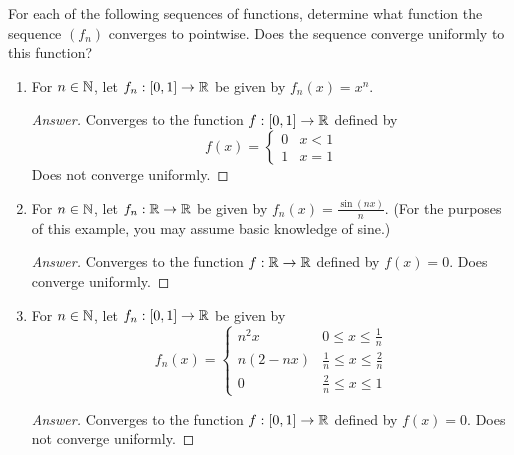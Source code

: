 \documentclass[../main.tex]{subfiles}
\begin{document}
\begin{exercise}\label{exr:17.5}
    For each of the following sequences of functions, determine what function the sequence $(f_n)$ converges to pointwise. Does the sequence converge uniformly to this function?
    \begin{enumerate}[label={(\alph*)}]
        \item For $n\in\mathbb{N}$, let $f_n:[0,1]\to\mathbb{R}$ be given by $f_n(x)=x^n$.
        \begin{proof}[Answer]
            Converges to the function $f:[0,1]\to\mathbb{R}$ defined by
            \begin{equation*}
                f(x) =
                \begin{cases}
                    0 & x<1\\
                    1 & x=1
                \end{cases}
            \end{equation*}
            Does not converge uniformly.
        \end{proof}
        \item For $n\in\mathbb{N}$, let $f_n:\mathbb{R}\to\mathbb{R}$ be given by $f_n(x)=\frac{\sin(nx)}{n}$. (For the purposes of this example, you may assume basic knowledge of sine.)
        \begin{proof}[Answer]
            Converges to the function $f:\mathbb{R}\to\mathbb{R}$ defined by $f(x)=0$. Does converge uniformly.
        \end{proof}
        \item For $n\in\mathbb{N}$, let $f_n:[0,1]\to\mathbb{R}$ be given by
        \begin{equation*}
            f_n(x) =
            \begin{cases}
                n^2x & 0\leq x\leq\frac{1}{n}\\
                n(2-nx) & \frac{1}{n}\leq x\leq\frac{2}{n}\\
                0 & \frac{2}{n}\leq x\leq 1
            \end{cases}
        \end{equation*}
        \begin{proof}[Answer]
            Converges to the function $f:[0,1]\to\mathbb{R}$ defined by $f(x)=0$. Does not converge uniformly.
        \end{proof}
    \end{enumerate}
\end{exercise}
\end{document}
